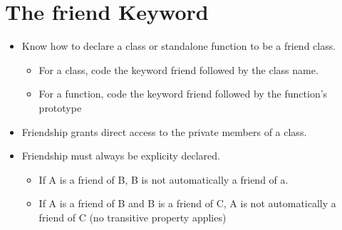 \documentclass{report}
\begin{document}
    \section{The friend Keyword}
    \begin{itemize}
      \item Know how to declare a class or standalone function to be a friend class.
        \begin{itemize}[label=$\circ$]
          \item For a class, code the keyword friend followed by the class name.
          \item For a function, code the keyword friend followed by the function's prototype
        \end{itemize}
      \item Friendship grants direct access to the private members of a class.
      \item Friendship must always be explicity declared.
        \begin{itemize}[label=$\circ$]
          \item If A is a friend of B, B is not automatically a friend of a.
          \item If A is a friend of B and B is a friend of C, A is not automatically a friend of C (no transitive property applies)
        \end{itemize}
    \end{itemize}
\end{document}
